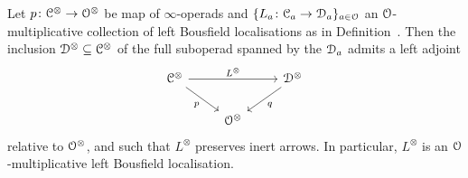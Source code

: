 \begin{proposition}
\label{proposition:multiplicative-localisation}%
Let $p\colon\mathcal C^{\otimes} \to \mathcal{O}^{\otimes}$ be map of $\infty$-operads and $\{L_a\colon \mathcal C_a \to \mathcal{D}_a\}_{a \in \mathcal{O}}$ an $\mathcal{O}$-multiplicative collection of left Bousfield localisations as in Definition~. 
Then the inclusion $\mathcal{D}^{\otimes} \subseteq \mathcal C^{\otimes}$ of the full suboperad spanned by the $\mathcal{D}_a$ admits a left adjoint
\[
\begin{tikzcd}
\C^{\otimes} \ar[rr,"L^{\otimes}"]\ar[dr,"p"'] && \D^{\otimes} \ar[dl,"q"] \\
& \cO^{\otimes} & 
\end{tikzcd}
\]
relative to $\mathcal{O}^{\otimes}$, and such that $L^{\otimes}$ preserves inert arrows. %
In particular, $L^{\otimes}$ is an $\mathcal{O}$-multiplicative left Bousfield localisation.
\end{proposition}
